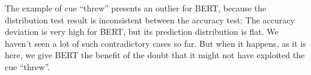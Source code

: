 The example of cue ``threw'' presents an outlier for BERT,
because the distribution test result is inconsistent between the accuracy test: 
The accuracy deviation is very high for BERT, but its prediction distribution is
flat. We haven't seen a lot of such contradictory cases so far. 
But when it happens, as it is here, we give BERT the benefit of the doubt 
that it might not have exploited the cue ``threw''. 


%

